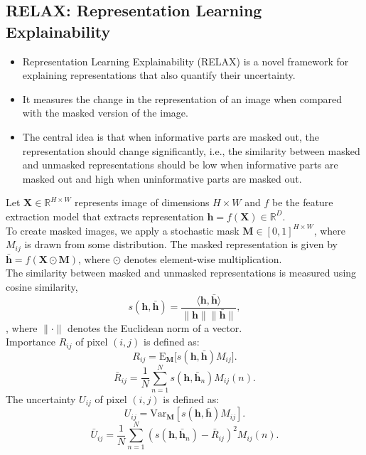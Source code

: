 \subsection{RELAX: Representation Learning Explainability}
\begin{itemize}
    \item Representation Learning Explainability (RELAX)\cite{wickstrøm2022relaxrepresentationlearningexplainability} is a novel framework for explaining representations that also quantify their uncertainty.
    \item It measures the change in the representation of an image when compared with the masked version of the image.
    \item The central idea is that when informative parts are masked out, the representation should change significantly, i.e., the similarity between masked and unmasked representations should be low when informative parts are masked out and high when uninformative parts are masked out.
\end{itemize} 
Let $\mathbf{X}\in \mathbb{R}^{H\times W}$ represents image of dimensions $H\times W$ and $f$ be the feature extraction model that extracts representation $\mathbf{h} = f(\mathbf{X}) \in \mathbb{R}^D$. \\
To create masked images, we apply a stochastic mask $\mathbf{M}\in [0, 1]^{H\times W}$, where $M_{ij}$ is drawn from some distribution.
The masked representation is given by $\bar{\mathbf{h}} = f(\mathbf{X}\odot \mathbf{M})$, where $\odot$ denotes element-wise multiplication.\\
The similarity between masked and unmasked representations is measured using cosine similarity, 
\begin{equation*}\label{eq:sim}
    s(\mathbf{h}, \bar{\mathbf{h}}) = \frac{\langle \mathbf{h}, \bar{\mathbf{h}}\rangle }{\lVert\mathbf{h}\rVert \lVert\bar{\mathbf{h}}\rVert},
\end{equation*}, where $\lVert\cdot\rVert$ denotes the Euclidean norm of a vector. \\
Importance $R_{ij}$ of pixel $(i,j)$ is defined as:
\begin{equation*}\label{eq:rel1}
    R_{ij} = \mathrm{E}_{\mathbf{M}}\big[s(\mathbf{h}, \bar{\mathbf{h}})M_{ij}\big].
\end{equation*}
\begin{equation*}\label{eq:rel2}
    \bar{R}_{ij} = \frac{1}{N}\sum\limits_{n=1}^N s(\mathbf{h}, \bar{\mathbf{h}}_n)M_{ij}(n).
\end{equation*}
The uncertainty $U_{ij}$ of pixel $(i,j)$ is defined as:
\begin{equation*}\label{eq:unc1}
    U_{ij} = \mathrm{Var}_{\mathbf{M}} [s(\mathbf{h}, \bar{\mathbf{h}})M_{ij}].
\end{equation*}
\begin{equation*}\label{eq:unc2}
    \bar{U}_{ij} = \frac{1}{N}\sum\limits_{n=1}^N (s(\mathbf{h}, \bar{\mathbf{h}}_n) - \bar{R}_{ij})^2 M_{ij}(n).
\end{equation*}


